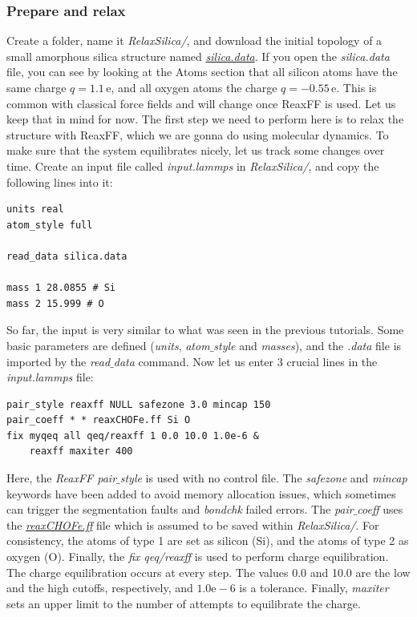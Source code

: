\documentclass[9pt,tutorial]{livecoms}
\begin{document}
\subsubsection{Prepare and relax}
Create a folder, name it \textit{RelaxSilica/}, and download the initial topology of a small amorphous silica structure named \href{https://raw.githubusercontent.com/lammpstutorials/lammpstutorials-article/main/files/tutorial5/silica.data}{\textit{silica.data}}. If you open the \textit{silica.data} file, you can see by looking at the Atoms section that all silicon atoms have the same charge $q = 1.1\,\text{e}$, and all oxygen atoms the charge $q = -0.55\,\text{e}$. This is common with classical force fields and will change once ReaxFF is used. Let us keep that in mind for now. The first step we need to perform here is to relax the structure with ReaxFF, which we are gonna do using molecular dynamics. To make sure that the system equilibrates nicely, let us track some changes over time. Create an input file called \textit{input.lammps} in \textit{RelaxSilica/}, and copy the following lines into it: 
{\normalsize \begin{verbatim}
units real
atom_style full

read_data silica.data

mass 1 28.0855 # Si
mass 2 15.999 # O
\end{verbatim}}
So far, the input is very similar to what was seen in the previous tutorials. Some basic parameters are defined (\textit{units}, \textit{atom$\_$style} and \textit{masses}), and the \textit{.data} file is imported by the \textit{read$\_$data} command. Now let us enter 3 crucial lines in the \textit{input.lammps} file:
{\normalsize \begin{verbatim}
pair_style reaxff NULL safezone 3.0 mincap 150
pair_coeff * * reaxCHOFe.ff Si O
fix myqeq all qeq/reaxff 1 0.0 10.0 1.0e-6 &
    reaxff maxiter 400
\end{verbatim}}
Here, the \textit{ReaxFF pair$\_$style} is used with no control file. The \textit{safezone} and \textit{mincap} keywords have been added to avoid memory allocation issues, which sometimes can trigger the segmentation faults and \textit{bondchk} failed errors. The \textit{pair$\_$coeff} uses the \href{https://raw.githubusercontent.com/lammpstutorials/lammpstutorials-article/main/files/tutorial5/reaxCHOFe.ff}{\textit{reaxCHOFe.ff}} file which is assumed to be saved within \textit{RelaxSilica/}. For consistency, the atoms of type 1 are set as silicon (Si), and the atoms of type 2 as oxygen (O). Finally, the \textit{fix qeq/reaxff} is used to perform charge equilibration. The charge equilibration occurs at every step. The values 0.0 and 10.0 are the low and the high cutoffs, respectively, and $1.0 \text{e} -6$ is a tolerance. Finally, \textit{maxiter} sets an upper limit to the number of attempts to equilibrate the charge. 
\end{document}

